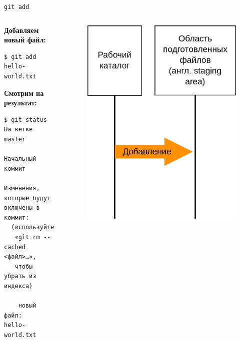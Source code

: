 \documentclass[presentation]{beamer}
\begin{document}
\begin{frame}[fragile]{\texttt{git add}}
  \begin{columns}
    \begin{column}{0.6\textwidth}
  \textbf{Добавляем новый файл:}
\begin{verbatim}
$ git add hello-world.txt
\end{verbatim}
  \textbf{Смотрим на результат:}
\begin{verbatim}
$ git status
На ветке master

Начальный коммит

Изменения, которые будут
включены в коммит:
  (используйте 
   «git rm --cached <файл>…»,
   чтобы убрать из индекса)

	новый файл:    hello-world.txt
\end{verbatim}
    \end{column}
    \begin{column}{0.4\textwidth}
      \begin{figure}[htb]
        \centering
        \includegraphics[width=1\textwidth]{git-operation-add}
      \end{figure}
    \end{column}
  \end{columns}
\end{frame}
\end{document}
